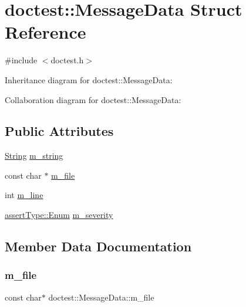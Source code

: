 \hypertarget{structdoctest_1_1MessageData}{}\section{doctest\+:\+:Message\+Data Struct Reference}
\label{structdoctest_1_1MessageData}


{\ttfamily \#include $<$doctest.\+h$>$}



Inheritance diagram for doctest\+:\+:Message\+Data\+:


Collaboration diagram for doctest\+:\+:Message\+Data\+:
\subsection*{Public Attributes}
\begin{DoxyCompactItemize}
\item 
\hyperlink{classdoctest_1_1String}{String} \hyperlink{structdoctest_1_1MessageData_a0ef5cfd7a399ee475d6357b6dcddfe53}{m\+\_\+string}
\item 
const char $\ast$ \hyperlink{structdoctest_1_1MessageData_acd1e6a5c4f03ed6e098cdab5956a3e17}{m\+\_\+file}
\item 
int \hyperlink{structdoctest_1_1MessageData_a7c1cf03250a68db5befbba63b3824d93}{m\+\_\+line}
\item 
\hyperlink{namespacedoctest_1_1assertType_ae1bb5bed722f34f1c38b83cb19d326d3}{assert\+Type\+::\+Enum} \hyperlink{structdoctest_1_1MessageData_a24e0a3f475609ce8e02cecc4cb0d3b48}{m\+\_\+severity}
\end{DoxyCompactItemize}


\subsection{Member Data Documentation}
\mbox{\label{structdoctest_1_1MessageData_acd1e6a5c4f03ed6e098cdab5956a3e17}} 
\subsubsection{\texorpdfstring{m\+\_\+file}{m\_file}}
{\footnotesize\ttfamily const char$\ast$ doctest\+::\+Message\+Data\+::m\+\_\+file}

